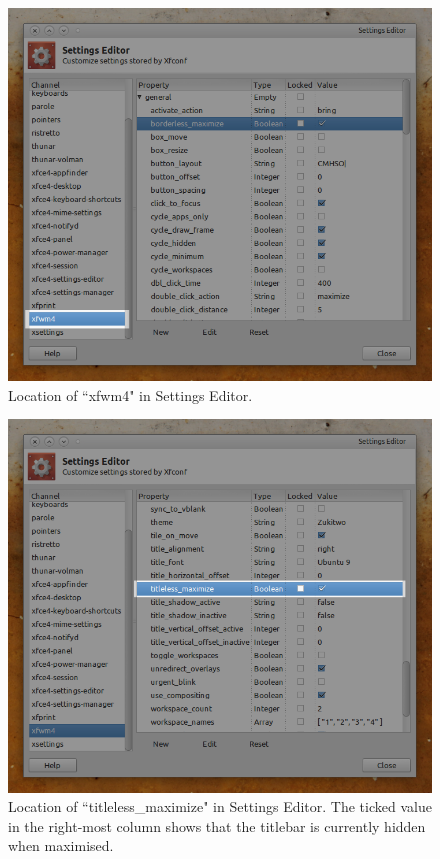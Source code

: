 \documentclass[12pt, a4paper]{article}
\begin{document}
\begin{figure}[h]
  \centering
  \includegraphics[width=1\textwidth]{imgs/4settingseditor.png}
  \caption{Location of ``xfwm4" in Settings Editor.}
  \label{fig4}
\end{figure}

\begin{figure}[h]
  \centering
  \includegraphics[width=1\textwidth]{imgs/5titlelessmaximise.png}
  \caption{Location of ``titleless\_maximize" in Settings Editor. The ticked value in the right-most column shows that the titlebar is currently hidden when maximised.}
  \label{fig5}
\end{figure}
\end{document}
